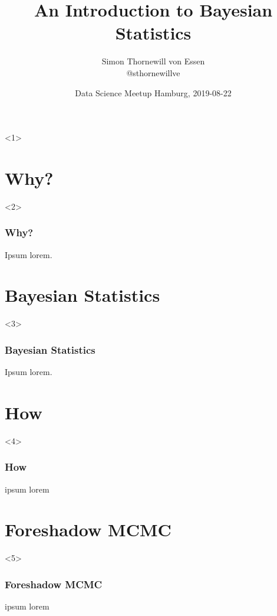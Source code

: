 \documentclass[hyperref={draft}]{beamer}
\title{An Introduction to Bayesian Statistics}
\author{Simon Thornewill von Essen \\ @sthornewillve}
\institute{Data Analyst\\ Goodgame Studios}
\date{Data Science Meetup Hamburg, 2019-08-22}
\begin{document}
\begin{frame}
  \titlepage
\end{frame}


\begin{frame}<1>
  \tableofcontents
\end{frame}



\section{Why?}

\begin{frame}<2>
  \frametitle{Why?}
Ipsum lorem.
\end{frame}



\section{Bayesian Statistics}

\begin{frame}<3>
  \frametitle{Bayesian Statistics}
Ipsum lorem.
\end{frame}



\section{How}

\begin{frame}<4>
  \frametitle{How}
ipsum lorem
\end{frame}



\section{Foreshadow MCMC}

\begin{frame}<5>
  \frametitle{Foreshadow MCMC}
ipsum lorem
\end{frame}

\end{document}
